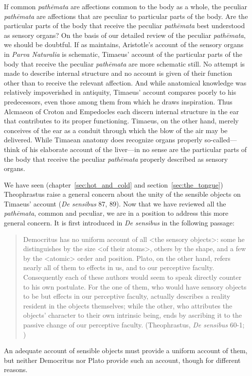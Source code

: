 If common \emph{pathēmata} are affections common to the body as a whole, the peculiar \emph{pathēmata} are affections that are peculiar to particular parts of the body. Are the particular parts of the body that receive the peculiar \emph{pathēmata} best understood as sensory organs? On the basis of our detailed review of the peculiar \emph{pathēmata}, we should be doubtful. If as \citet{Lloyd:1978fk} maintains, Aristotle's account of the sensory organs in \emph{Parva Naturalia} is schematic, Timaeus' account of the particular parts of the body that receive the peculiar \emph{pathēmata} are more schematic still. No attempt is made to describe internal structure and no account is given of their function other than to receive the relevant affection. And while anatomical knowledge was relatively impoverished in antiquity, Timaeus' account compares poorly to his predecessors, even those among them from which he draws inspiration. Thus Alcmaeon of Croton and Empedocles each discern internal structure in the ear that contributes to its proper functioning. Timaeus, on the other hand, merely conceives of the ear as a conduit through which the blow of the air may be delivered. While Timaean anatomy does recognize organs properly so-called---think of his elaborate account of the liver---in no sense are the particular parts of the body that receive the peculiar \emph{pathēmata} properly described as sensory organs.

We have seen (chapter~\ref{sec:hot_and_cold} and section~\ref{sec:the_tongue}) Theophrastus raise a general concern about the unity of the sensible objects on Timaeus' account (\emph{De sensibus} 87, 89). Now that we have reviewed all the \emph{pathēmata}, common and peculiar, we are in a position to address this more general concern. It is first introduced in \emph{De sensibus} in the following passage:
\begin{quote}
	Democritus has no uniform account of all <the sensory objects>: some he distinguishes by the size <of their atoms>, others by the shape, and a few by the <atomic> order and position. Plato, on the other hand, refers nearly all of them to effects in us, and to our perceptive faculty. Consequently each of these authors would seem to speak directly counter to his own postulate. For the one of them, who would have sensory objects to be but effects in our perceptive faculty, actually describes a reality resident in the objects themselves; while the other, who attributes the objects' character to their own intrinsic being, ends by ascribing it to the passive change of our perceptive faculty. (Theophrastus, \emph{De sensibus} 60-1; \citealt[121]{Stratton:1917vn})
\end{quote}
An adequate account of sensible objects must provide a uniform account of them, but neither Democritus nor Plato provide such an account, though for different reasons. 

